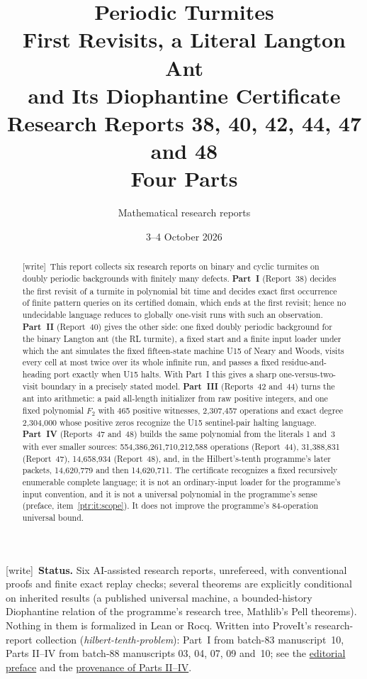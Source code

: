 \documentclass[11pt,letterpaper]{article}
\title{\textbf{Periodic Turmites}\\[4pt]
\textbf{First Revisits, a Literal Langton Ant}\\[4pt]
\textbf{and Its Diophantine Certificate}\\[9pt]
\large Research Reports 38, 40, 42, 44, 47 and 48\\[7pt]
\normalsize Four Parts}
\author{Mathematical research reports}
\date{3--4 October 2026}
\theoremstyle{definition}\newtheorem{definition}[theorem]{Definition}
\theoremstyle{remark}\newtheorem{remark}[theorem]{Remark}
\newcommand{\wtag}{\textup{[write]}}
\begin{document}
\maketitle
\begin{abstract}
\wtag\ This report collects six research reports on binary and cyclic turmites on doubly periodic backgrounds with finitely many defects. \textbf{Part~I} (Report~38) decides the first revisit of a turmite in polynomial bit time and decides exact first occurrence of finite pattern queries on its certified domain, which ends at the first revisit; hence no undecidable language reduces to globally one-visit runs with such an observation. \textbf{Part~II} (Report~40) gives the other side: one fixed doubly periodic background for the binary Langton ant (the RL turmite), a fixed start and a finite input loader under which the ant simulates the fixed fifteen-state machine U15 of Neary and Woods, visits every cell at most twice over its whole infinite run, and passes a fixed residue-and-heading port exactly when U15 halts. With Part~I this gives a sharp one-versus-two-visit boundary in a precisely stated model. \textbf{Part~III} (Reports~42 and~44) turns the ant into arithmetic: a paid all-length initializer from raw positive integers, and one fixed polynomial $F_2$ with 465 positive witnesses, 2,307,457 operations and exact degree 2,304,000 whose positive zeros recognize the U15 sentinel-pair halting language. \textbf{Part~IV} (Reports~47 and~48) builds the same polynomial from the literals 1 and~3 with ever smaller sources: 554,386,261,710,212,588 operations (Report~44), 31,388,831 (Report~47), 14,658,934 (Report~48), and, in the Hilbert's-tenth programme's later packets, 14,620,779 and then 14,620,711. The certificate recognizes a fixed recursively enumerable complete language; it is not an ordinary-input loader for the programme's input convention, and it is not a universal polynomial in the programme's sense (preface, item~\ref{ptr:it:scope}). It does not improve the programme's 84-operation universal bound.
\end{abstract}

\begin{center}
\begin{minipage}{0.9\textwidth}\small\raggedright
\noindent\wtag\ \textbf{Status.} Six AI-assisted research reports, unrefereed,
with conventional proofs and finite exact replay checks; several theorems are
explicitly conditional on inherited results (a published universal machine,
a bounded-history Diophantine relation of the programme's research tree,
Mathlib's Pell theorems). Nothing in them is formalized in Lean or Rocq.
Written into ProveIt's research-report collection
(\emph{hilbert-tenth-problem}): Part~I from batch-83 manuscript~10, Parts
II--IV from batch-88 manuscripts 03, 04, 07, 09 and~10; see the
\hyperref[ptr:sec:overview]{editorial preface} and the
\hyperref[ptr:sec:prov88]{provenance of Parts II--IV}.
\end{minipage}
\end{center}
\end{document}
